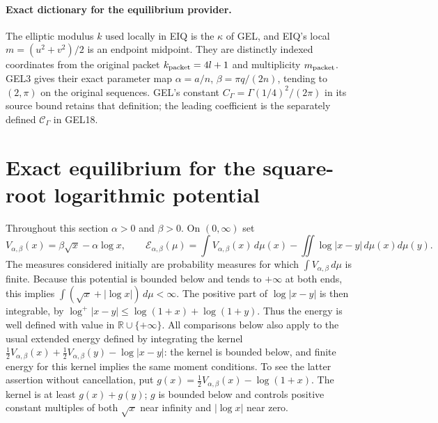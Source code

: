 \documentclass[11pt,a4paper]{article}
\begin{document}

\paragraph{Exact dictionary for the equilibrium provider.}
The elliptic modulus $k$ used locally in EIQ is the $\kappa$ of GEL,
and EIQ's local $m=(u^2+v^2)/2$ is an endpoint midpoint. They are
distinctly indexed coordinates from the original packet
$k_{\rm packet}=4l+1$ and multiplicity $m_{\rm packet}$.
GEL3 gives their exact parameter map
$\alpha=a/n$, $\beta=\pi q/(2n)$, tending to $(2,\pi)$ on
the original sequences. GEL's constant $C_\Gamma=\Gamma(1/4)^2/(2\pi)$
in its source bound retains that definition; the leading coefficient
is the separately defined $\mathcal C_\Gamma$ in GEL18.

\section{Exact equilibrium for the square-root logarithmic potential}
\label{sec:independent-sqrt-log-equilibrium}

Throughout this section $\alpha>0$ and $\beta>0$.  On $(0,\infty)$ set
\begin{equation}\tag{EIQ1}
 V_{\alpha,\beta}(x)=\beta\sqrt{x}-\alpha\log x,
 \qquad
 \mathcal E_{\alpha,\beta}(\mu)
 =\int V_{\alpha,\beta}(x)\,d\mu(x)
       -\iint\log|x-y|\,d\mu(x)d\mu(y).
\end{equation}
The measures considered initially are probability measures for which
$\int V_{\alpha,\beta}\,d\mu$ is finite.  Because this potential is bounded
below and tends to $+\infty$ at both ends, this implies
$\int(\sqrt{x}+|\log x|)\,d\mu<\infty$.
The positive part of $\log|x-y|$ is then integrable, by
$\log^+|x-y|\leq\log(1+x)+\log(1+y)$.
Thus the energy is well defined with value in $\mathbb R\cup\{+\infty\}$.
All comparisons below also apply to the usual extended energy defined by
integrating the kernel
$\tfrac12V_{\alpha,\beta}(x)+\tfrac12V_{\alpha,\beta}(y)-\log|x-y|$:
the kernel is bounded below, and finite energy for this kernel implies the
same moment conditions.  To see the latter assertion without cancellation,
put $g(x)=\tfrac12V_{\alpha,\beta}(x)-\log(1+x)$.
The kernel is at least $g(x)+g(y)$; $g$ is bounded below and controls positive
constant multiples of both $\sqrt{x}$ near infinity and $|\log x|$ near zero.
\end{document}
